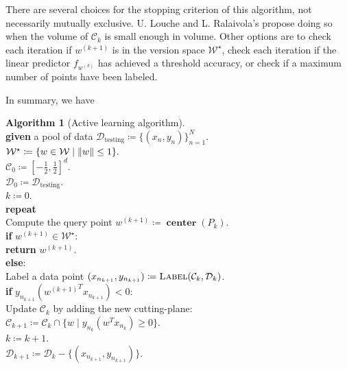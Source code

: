 \documentclass[11pt]{amsart}
\theoremstyle{definition}
\newtheorem{algorithm}{Algorithm}
\theoremstyle{remark}
\newcommand{\ind}{\hspace*{0.5cm}}
\newcommand{\transpose}{T}
\DeclareMathOperator{\centerr}{\textbf{center}}
\begin{document}
            There are several choices for the stopping criterion of this algorithm, not necessarily mutually exclusive. U. Louche and L. Ralaivola's \cite[Section III.D]{LR15} propose doing so when the volume of $\mathcal{C}_k$ is small enough in volume. Other options are to check each iteration if $w^{(k+1)}$ is in the version space $\mathcal{W}^\star$, check each iteration if the linear predictor $f_{w^{(k)}}$ has achieved a threshold accuracy, or check if a maximum number of points have been labeled.

        In summary, we have
        \begin{algorithm}[Active learning algorithm]
        \label{a:active}\mbox{}\\
            \ind \textbf{given} a pool of data $\mathcal{D}_\text{testing} \coloneqq \{(x_n, y_n)\}_{n=1}^N$. \\
            \ind $\mathcal{W}^\star \coloneqq \{w \in \mathcal{W} \;|\; \norm{w} \leq 1\}.$ \\
            \ind $\mathcal{C}_0 \coloneqq [-\frac{1}{2}, \frac{1}{2}]^d.$ \\
            \ind $\mathcal{D}_0 \coloneqq \mathcal{D}_\text{testing}.$ \\
            \ind $k \coloneqq 0$. \\
            \ind \textbf{repeat} \\
            \ind\ind Compute the query point $w^{(k+1)} \coloneqq \centerr({P}_k)$. \\
            \ind\ind \textbf{if} $w^{(k+1)} \in \mathcal{W}^\star$: \\
            \ind\ind\ind\textbf{return} $w^{(k+1)}$. \\
            \ind\ind \textbf{else}: \\
            \ind\ind\ind Label a data point $(x_{n_{k+1}}, y_{n_{k+1}}) \coloneqq \textsc{Label}(\mathcal{C}_k, \mathcal{D}_k)$. \\
            \ind\ind\ind \textbf{if} $y_{n_{k+1}} ({w^{(k+1)}}^\transpose x_{n_{k+1}}) < 0:$ \\
            \ind\ind\ind\ind Update $\mathcal{C}_k$ by adding the new cutting-plane: \\
            \ind\ind\ind\ind\ind $\mathcal{C}_{k+1} \coloneqq \mathcal{C}_{k} \cap \{w \;|\; y_{n_k} (w^\transpose x_{n_k}) \geq 0\}$. \\
            \ind\ind $k \coloneqq k + 1$. \\
            \ind\ind $\mathcal{D}_{k+1} \coloneqq \mathcal{D}_k - \{(x_{n_{k+1}}, y_{n_{k+1}})\}$. \\

\end{algorithm}
\end{document}
